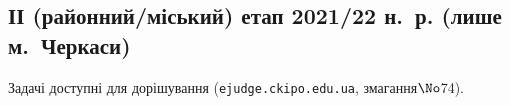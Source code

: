  \renewenvironment{problemAllDefault}[1]{\vspace{10mm}\par\begin{problem}{#1}{\stdinOrInputTxt}{\stdoutOrOutputTxt}{1 сек}{256 мегабайтів}}{\end{problem}}

\PrintEjudgeConstraintsfalse

\subsection{ІІ (районний/міський) етап 2021/22 н.~р. (лише м.~Черкаси)}

Задачі доступні для дорішування (\verb"ejudge.ckipo.edu.ua", змагання\nolinebreak[3] $\No$74).



	

	

	

	


